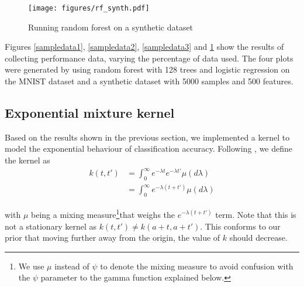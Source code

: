 \documentclass[a4paper,12pt,twoside,openright]{report}
\begin{document}
\begin{figure}
\centering
  \texttt{[image: figures/rf\_synth.pdf]}
  \caption{Running random forest on a synthetic dataset}
  \label{sampledata4}
\end{figure}



Figures \ref{sampledata1}, \ref{sampledata2}, \ref{sampledata3} and \ref{sampledata4} show the results of collecting performance data, varying the percentage of data used. The four plots were generated by using random forest with 128 trees and logistic regression on the MNIST dataset and a synthetic dataset with 5000 samples and 500 features.









\subsection{Exponential mixture kernel}
Based on the results shown in the previous section, we implemented a kernel to model the exponential behaviour of classification accuracy. Following \cite{2014arXiv1406.3896S}, we define the kernel as
\begin{align}
k(t,t') &= \int_{0}^{\infty} e^{-\lambda t}e^{-\lambda t'}\mu(d\lambda)\\
&= \int_{0}^{\infty} e^{-\lambda(t+t')}\mu(d\lambda)
\end{align}

with $\mu$ being a mixing measure\footnote{We use $\mu$ instead of $\psi$ to denote the mixing measure to avoid confusion with the $\psi$ parameter to the gamma function explained below.}that weighs the $e^{-\lambda(t+t')}$ term. Note that this is not a stationary kernel as $k(t, t') \neq k(a + t, a + t')$. This conforms to our prior that moving further away from the origin, the value of $k$ should decrease.
\end{document}
